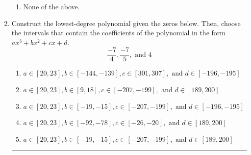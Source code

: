 \documentclass[14pt]{extbook}
\newcommand{\litem}[1]{\item#1\hspace*{-1cm}\rule{\textwidth}{0.4pt}}
\begin{document}
\begin{enumerate}
{\begin{enumerate}[label=\Alph*.]
\item None of the above.
\end{enumerate} }
\litem{
Construct the lowest-degree polynomial given the zeros below. Then, choose the intervals that contain the coefficients of the polynomial in the form $ax^3+bx^2+cx+d$.\[ \frac{-7}{4}, \frac{-7}{5}, \text{ and } 4 \]\begin{enumerate}[label=\Alph*.]
\item \( a \in [20, 23], b \in [-144, -139], c \in [301, 307], \text{ and } d \in [-196, -195] \)
\item \( a \in [20, 23], b \in [9, 18], c \in [-207, -199], \text{ and } d \in [189, 200] \)
\item \( a \in [20, 23], b \in [-19, -15], c \in [-207, -199], \text{ and } d \in [-196, -195] \)
\item \( a \in [20, 23], b \in [-92, -78], c \in [-26, -20], \text{ and } d \in [189, 200] \)
\item \( a \in [20, 23], b \in [-19, -15], c \in [-207, -199], \text{ and } d \in [189, 200] \)


\end{enumerate}}
\end{enumerate}
\end{document}
